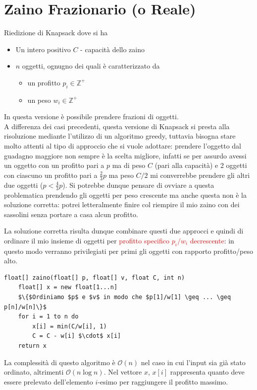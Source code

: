 \documentclass[../cheatSheetAlgoritmi.tex]{subfiles}
\begin{document}
\section{Zaino Frazionario (o Reale)}
Riedizione di Knapsack dove si ha
\begin{itemize}
	\item Un intero positivo $C$ - capacità dello zaino
	\item $n$ oggetti, ognugno dei quali è caratterizzato da
	\begin{itemize}
		\item un profitto $p_{i} \in \mathbb{Z}^{+}$
		\item un peso $w_{i} \in \mathbb{Z}^{+}$
	\end{itemize}
\end{itemize}
In questa versione è possibile prendere frazioni di oggetti.\\
A differenza dei casi precedenti, questa versione di Knapsack si presta alla risoluzione mediante l'utilizzo di un algoritmo greedy, tuttavia bisogna stare molto attenti al tipo di approccio che si vuole adottare: prendere l'oggetto dal guadagno maggiore non sempre è la scelta migliore, infatti se per assurdo avessi un oggetto con un profitto pari a $p$ ma di peso $C$ (pari alla capacità) e 2 oggetti con ciascuno un profitto pari a $\frac{2}{3} p$ ma peso $C/2$ mi converrebbe prendere gli altri due oggetti ($p < \frac{4}{3}p$). Si potrebbe dunque pensare di ovviare a questa problematica prendendo gli oggetti per peso crescente ma anche questa non è la soluzione corretta: potrei letteralmente finire col riempire il mio zaino con dei sassolini senza portare a casa alcun profitto.

La soluzione corretta risulta dunque combinare questi due approcci e quindi di ordinare il mio insieme di oggetti per \textcolor{red}{profitto specifico $p_{i}/w_{i}$ decrescente}: in questo modo verranno privilegiati per primi gli oggetti con rapporto profitto/peso alto.
\begin{lstlisting}[caption=Zaino Frazionario]
float[] zaino(float[] p, float[] v, float C, int n)
	float[] x = new float[1...n]
	$\{$Ordiniamo $p$ e $v$ in modo che $p[1]/w[1] \geq ... \geq p[n]/w[n]\}$
	for i = 1 to n do
		x[i] = min(C/w[i], 1)
		C = C - w[i] $\cdot$ x[i]
	return x
\end{lstlisting}
La complessità di questo algoritmo è $\mathcal{O}(n)$ nel caso in cui l'input sia già stato ordinato, altrimenti $\mathcal{O}(n \log{n})$. Nel vettore $x$, $x[i]$ rappresenta quanto deve essere prelevato dell'elemento $i$-esimo per raggiungere il profitto massimo.
\end{document}
